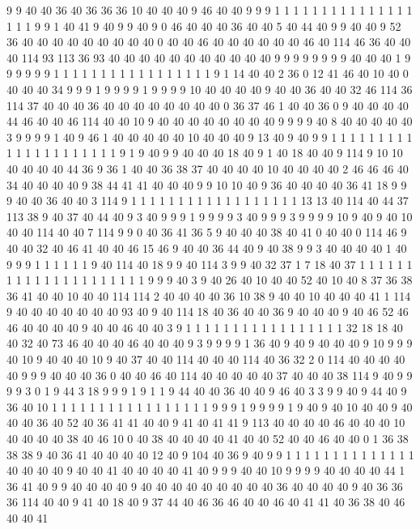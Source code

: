 9 9 40 40 36 40 36 36 36 10 40 40 40 9 46 40 40 9 9 9
1 1 1 1 1 1 1 1 1 1 1 1 1 1 1 1 1 1 9 9
1 40 41 9 40 9 9 40 9 0 46 40 40 40 36 40 40 5 40 44
40 9 9 40 40 9 52 36 40 40 40 40 40 40 40 40 40 0 40 40
46 40 40 40 40 40 40 46 40 114 46 36 40 40 40 114 93 113 36 93
40 40 40 40 40 40 40 40 40 40 40 9 9 9 9 9 9 9 9 40
40 40 1 9 9 9 9 9 9 1 1 1 1 1 1 1 1 1 1 1
1 1 1 1 1 1 9 1 14 40 40 2 36 0 12 41 46 40 10 40
0 40 40 40 34 9 9 9 1 9 9 9 9 1 9 9 9 9 10 40
40 40 40 9 40 40 36 40 40 32 46 114 36 114 37 40 40 40 36 40
40 40 40 40 40 40 40 0 36 37 46 1 40 40 36 0 9 40 40 40
40 44 46 40 40 46 114 40 40 10 9 40 40 40 40 40 40 40 40 9
9 9 9 40 8 40 40 40 40 40 3 9 9 9 9 1 40 9 46 1
40 40 40 40 40 10 40 40 40 9 13 40 9 40 9 9 1 1 1 1
1 1 1 1 1 1 1 1 1 1 1 1 1 1 1 1 1 9 1 9
40 9 9 40 40 40 18 40 9 1 40 18 40 40 9 114 9 10 10 40
40 40 40 44 36 9 36 1 40 40 36 38 37 40 40 40 40 10 40 40
40 40 2 46 46 46 40 34 40 40 40 40 9 38 44 41 41 40 40 40
9 9 10 10 40 9 36 40 40 40 40 36 41 18 9 9 9 40 40 36
40 40 3 114 9 1 1 1 1 1 1 1 1 1 1 1 1 1 1 1
1 1 1 13 13 40 114 40 44 37 113 38 9 40 37 40 44 40 9 3
40 9 9 9 1 9 9 9 9 3 40 9 9 9 3 9 9 9 9 10
9 40 9 40 10 40 40 114 40 40 7 114 9 9 0 40 36 41 36 5
9 40 40 40 38 40 41 0 40 40 0 114 46 9 40 40 32 40 46 41
40 40 46 15 46 9 40 40 36 44 40 9 40 38 9 9 3 40 40 40
40 1 40 9 9 9 1 1 1 1 1 1 9 40 114 40 18 9 9 40
114 3 9 9 40 32 37 1 7 18 40 37 1 1 1 1 1 1 1 1
1 1 1 1 1 1 1 1 1 1 1 1 1 9 9 9 40 3 9 40
26 40 10 40 40 52 40 10 40 8 37 36 38 36 41 40 40 10 40 40
114 114 2 40 40 40 40 36 10 38 9 40 40 10 40 40 40 41 1 114
9 40 40 40 40 40 40 40 93 40 9 40 114 18 40 36 40 40 36 9
40 40 40 9 40 46 52 46 46 40 40 40 40 9 40 40 46 40 40 3
9 1 1 1 1 1 1 1 1 1 1 1 1 1 1 1 1 1 32 18
18 40 40 32 40 73 46 40 40 40 46 40 40 40 9 3 9 9 9 9
1 36 40 9 40 9 40 40 40 9 10 9 9 9 40 10 9 40 40 40
10 9 40 37 40 40 114 40 40 40 114 40 36 32 2 0 114 40 40 40
40 40 9 9 9 40 40 40 36 0 40 40 46 40 114 40 40 40 40 40
37 40 40 40 38 114 9 40 9 9 9 9 3 0 1 9 44 3 18 9
9 9 1 9 1 1 9 44 40 40 36 40 40 9 46 40 3 3 9 9
40 9 44 40 9 36 40 10 1 1 1 1 1 1 1 1 1 1 1 1
1 1 1 1 1 9 9 9 1 9 9 9 9 1 9 40 9 40 10 40
40 9 40 40 40 36 40 52 40 36 41 41 40 40 9 41 40 41 41 9
113 40 40 40 40 46 40 40 40 10 40 40 40 40 38 40 46 10 0 40
38 40 40 40 40 41 40 40 52 40 40 46 40 40 0 1 36 38 38 38
9 40 36 41 40 40 40 40 12 40 9 104 40 36 9 40 9 9 1 1
1 1 1 1 1 1 1 1 1 1 1 1 40 40 40 40 9 40 40 41
40 40 40 40 41 40 9 9 9 40 40 10 9 9 9 9 40 40 40 40
44 1 36 41 40 9 9 40 40 40 40 9 40 40 40 40 40 40 40 40
40 36 40 40 40 40 9 40 36 36 36 114 40 40 9 41 40 18 40 9
37 44 40 46 36 46 40 40 46 40 41 41 40 36 38 40 46 40 40 41

